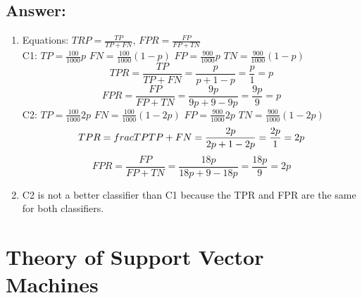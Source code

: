 \documentclass{article}
\begin{document}
\subsection*{Answer:}
\begin{enumerate} [label= (\alph*)]
    \item Equations:
    $TRP = \frac{TP}{TP + FN}$, $FPR = \frac{FP}{FP + TN}$\\
    C1:
    $TP = \frac{100}{1000}p$
    $FN = \frac{100}{1000}(1-p)$
    $FP = \frac{900}{1000}p$
    $TN = \frac{900}{1000}(1-p)$
    \begin{equation}
        TPR = \frac{TP}{TP + FN} = \frac{p}{p + 1 - p} = \frac{p}{1} = p
    \end{equation}
    \begin{equation}
        FPR = \frac{FP}{FP + TN} = \frac{9p}{9p + 9 - 9p} = \frac{9p}{9} = p
    \end{equation}
    C2:
    $TP = \frac{100}{1000}2p$
    $FN = \frac{100}{1000}(1-2p)$
    $FP = \frac{900}{1000}2p$
    $TN = \frac{900}{1000}(1-2p)$
    \begin{equation}
        TPR = \\frac{TP}{TP + FN} = \frac{2p}{2p + 1 - 2p} = \frac{2p}{1} = 2p
    \end{equation}
    \begin{equation}
        FPR = \frac{FP}{FP + TN} = \frac{18p}{18p + 9 - 18p} = \frac{18p}{9} = 2p
    \end{equation}

    \item C2 is not a better classifier than C1 because the TPR and FPR are the same for both classifiers. 
\end{enumerate}

\section{Theory of Support Vector Machines}
\end{document}
